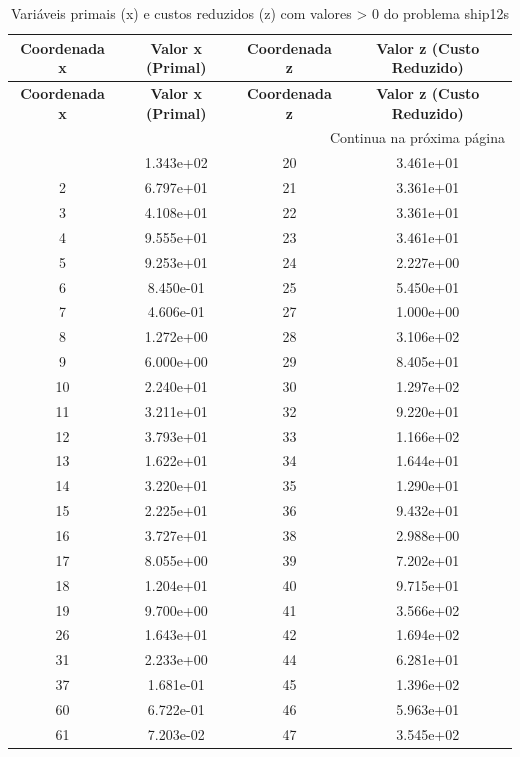 \documentclass[12pt]{article}
\begin{document}
\begin{longtable}{@{}cccc@{}}
\caption{Variáveis primais (x) e custos reduzidos (z) com valores > 0 do problema ship12s} \\
\toprule
\textbf{Coordenada x} & \textbf{Valor x (Primal)} & \textbf{Coordenada z} & \textbf{Valor z (Custo Reduzido)} \\
\midrule
\endfirsthead

\toprule
\textbf{Coordenada x} & \textbf{Valor x (Primal)} & \textbf{Coordenada z} & \textbf{Valor z (Custo Reduzido)} \\
\midrule
\endhead

\midrule \multicolumn{4}{r}{{Continua na próxima página}} \\ \midrule
\endfoot

\bottomrule
\endlastfoot
1 & 1.343e+02 & 20 & 3.461e+01 \\
2 & 6.797e+01 & 21 & 3.361e+01 \\
3 & 4.108e+01 & 22 & 3.361e+01 \\
4 & 9.555e+01 & 23 & 3.461e+01 \\
5 & 9.253e+01 & 24 & 2.227e+00 \\
6 & 8.450e-01 & 25 & 5.450e+01 \\
7 & 4.606e-01 & 27 & 1.000e+00 \\
8 & 1.272e+00 & 28 & 3.106e+02 \\
9 & 6.000e+00 & 29 & 8.405e+01 \\
10 & 2.240e+01 & 30 & 1.297e+02 \\
11 & 3.211e+01 & 32 & 9.220e+01 \\
12 & 3.793e+01 & 33 & 1.166e+02 \\
13 & 1.622e+01 & 34 & 1.644e+01 \\
14 & 3.220e+01 & 35 & 1.290e+01 \\
15 & 2.225e+01 & 36 & 9.432e+01 \\
16 & 3.727e+01 & 38 & 2.988e+00 \\
17 & 8.055e+00 & 39 & 7.202e+01 \\
18 & 1.204e+01 & 40 & 9.715e+01 \\
19 & 9.700e+00 & 41 & 3.566e+02 \\
26 & 1.643e+01 & 42 & 1.694e+02 \\
31 & 2.233e+00 & 44 & 6.281e+01 \\
37 & 1.681e-01 & 45 & 1.396e+02 \\
60 & 6.722e-01 & 46 & 5.963e+01 \\
61 & 7.203e-02 & 47 & 3.545e+02 \\

\end{longtable}
\end{document}
